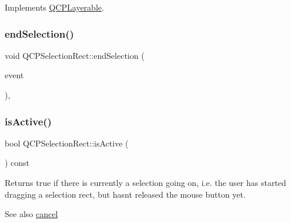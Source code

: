 Implements \mbox{\hyperlink{class_q_c_p_layerable_aecf2f7087482d4b6a78cb2770e5ed12d}{Q\+C\+P\+Layerable}}.

\mbox{\label{class_q_c_p_selection_rect_a625bcffd73987f6de6c6559aaf29ab9d}} 
\subsubsection{\texorpdfstring{endSelection()}{endSelection()}}
{\footnotesize\ttfamily void Q\+C\+P\+Selection\+Rect\+::end\+Selection (\begin{DoxyParamCaption}\item[{Q\+Mouse\+Event $\ast$}]{event }\end{DoxyParamCaption})\hspace{0.3cm}{\ttfamily [protected]}, {\ttfamily [virtual]}}

\mbox{\label{class_q_c_p_selection_rect_ad27c1569c6ea8fa48e24b81e2a302df3}} 
\subsubsection{\texorpdfstring{isActive()}{isActive()}}
{\footnotesize\ttfamily bool Q\+C\+P\+Selection\+Rect\+::is\+Active (\begin{DoxyParamCaption}{ }\end{DoxyParamCaption}) const\hspace{0.3cm}{\ttfamily [inline]}}

Returns true if there is currently a selection going on, i.\+e. the user has started dragging a selection rect, but hasn\textquotesingle{}t released the mouse button yet.

\begin{DoxySeeAlso}{See also}
\mbox{\hyperlink{class_q_c_p_selection_rect_af67bc58f4f5ce9a4dc420b9c42de235a}{cancel}} 
\end{DoxySeeAlso}
\mbox{\label{class_q_c_p_selection_rect_a1affe764316d6122a26fdb2e9583feb1}} 
